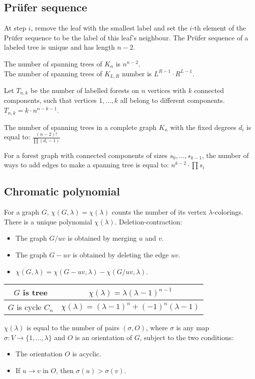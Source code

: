 \subsection*{Prüfer sequence}
At step $i$, remove the leaf with the smallest label and set the $i$-th
element of the Prüfer sequence to be the label of this leaf's neighbour.
The Prüfer sequence of a labeled tree is unique and has length $n - 2$.

The number of spanning trees of $K_n$ is $n^{n - 2}$.\\
The number of spanning trees of $K_{L, R}$ number is $L^{R - 1} \cdot R^{L - 1}$.

Let $T_{n, k}$ be the number of labelled forests on $n$ vertices with $k$ connected components,
such that vertices $1, \dots, k$ all belong to different components.
$T_{n,k} = k \cdot n^{n - k - 1}$.

The number of spanning trees in a complete graph $K_{n}$ with the fixed degrees
$d_{i}$ is equal to:
$ \frac{(n - 2)!}{\prod(d_i - 1)} $

For a forest graph with connected components of sizes $s_0, \dots, s_{k - 1}$, 
the number of ways to add edges to make a spanning tree is equal to:
$ n^{k - 2} \cdot \prod s_i$

\subsection*{Chromatic polynomial}
For a graph $G$, $\chi(G, \lambda) = \chi(\lambda)$ counts the number of its vertex $\lambda$-colorings.
There is a unique polynomial $\chi(\lambda)$. Deletion-contraction:
\begin{itemize}
\item The graph $G/uv$ is obtained by merging $u$ and $v$.
\item The graph $G - uv$ is obtained by deleting the edge $uv$.
\item $\chi(G, \lambda) = \chi(G - uv, \lambda) - \chi(G/uv, \lambda)$. 
\end{itemize}

\begin{tabular}{|c|c|}
\hline
$G$ is tree & $\chi(\lambda) = \lambda(\lambda - 1)^{n - 1}$ \\
\hline
$G$ is cycle $C_n$ & $\chi(\lambda) = (\lambda - 1)^n + (-1)^n(\lambda - 1)$\\
\hline
\end{tabular} 
 
\begin{proposition}
    $\chi(\lambda)$ is equal to the number of pairs $(\sigma, O)$, 
    where $\sigma$ is any map $\sigma : V \rightarrow \{1, \dots, \lambda\}$ and $O$ is an orientation of $G$, 
    subject to the two conditions:
    \begin{itemize}
        \item The orientation $O$ is acyclic.
        \item If $u \rightarrow v$ in $O$, then $\sigma (u) > \sigma (v)$.
    \end{itemize}
\end{proposition}

